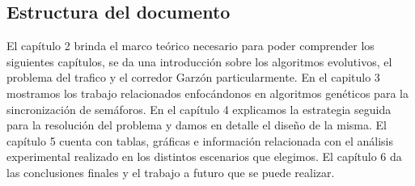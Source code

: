 \subsection{Estructura del documento}
El capítulo 2 brinda el marco teórico necesario para poder comprender los siguientes capítulos, se da una introducción sobre los algoritmos evolutivos, el problema del trafico y el corredor Garzón particularmente.
En el capitulo 3 mostramos los trabajo relacionados enfocándonos en algoritmos genéticos para la sincronización de semáforos.
En el capítulo 4 explicamos la estrategia seguida para la resolución del problema y damos en detalle el diseño de la misma.
El capítulo 5 cuenta con tablas, gráficas e información relacionada con el análisis experimental realizado en los distintos escenarios que elegimos.
El capítulo 6 da las conclusiones finales y el trabajo a futuro que se puede realizar.






